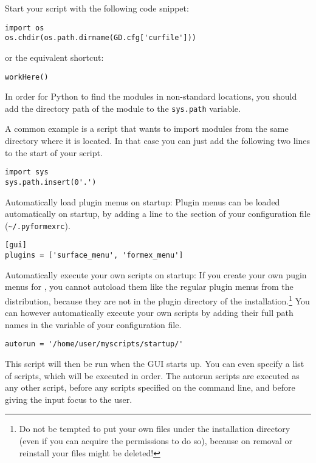 \begin{description}
\item[Set the directory where a script is found as the current working directory]
Start your script with the following code snippet:
\begin{verbatim}
import os
os.chdir(os.path.dirname(GD.cfg['curfile']))
\end{verbatim}
or the equivalent shortcut:
\begin{verbatim}
workHere()
\end{verbatim}

\item[Import modules from your own script directories]
In order for Python to find the modules in non-standard locations, you should add the directory path of the module to the \verb|sys.path| variable. 

A common example is a script that wants to import modules from the same directory where it is located. In that case you can just add the following two lines to the start of your script.
\begin{verbatim}
import sys
sys.path.insert(0'.')
\end{verbatim}

\item Automatically load plugin menus on startup:
Plugin menus can be loaded automatically on \pyformex startup, by adding a line to the  section of your configuration file (\verb|~/.pyformexrc|).
\begin{verbatim}
[gui]
plugins = ['surface_menu', 'formex_menu']
\end{verbatim}

\item Automatically execute your own scripts on startup:
If you create your own pugin menus for \pyformex, you cannot autoload them like the regular plugin menus from the distribution, because they are not in the plugin directory of the installation.\footnote{Do not be tempted to put your own files under the installation directory (even if you can acquire the permissions to do so), because on removal or reinstall your files might be deleted!}
You can however automatically execute your own scripts by adding their full path names in the  variable of your configuration file.
\begin{verbatim}
autorun = '/home/user/myscripts/startup/'
\end{verbatim}
This script will then be run when the \pyformex GUI starts up. You can even specify a list of scripts, which will be executed in order.
The autorun scripts are executed as any other \pyformex script, before any scripts specified on the command line, and before giving the input focus to the user.


\end{description}

